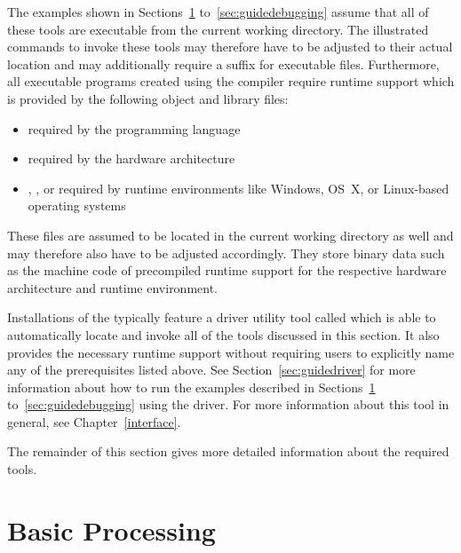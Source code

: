 The examples shown in Sections~\ref{sec:guidebasic} to~\ref{sec:guidedebugging} assume that all of these tools are executable from the current working directory.
The illustrated commands to invoke these tools may therefore have to be adjusted to their actual location and may additionally require a suffix for executable files.
Furthermore, all executable programs created using the compiler require runtime support which is provided by the following object and library files:

\begin{itemize}
\item {} required by the programming language
\item {} required by the hardware architecture
\item {}, , or  required by runtime environments like Windows, OS~X, or Linux-based operating systems
\end{itemize}

These files are assumed to be located in the current working directory as well and may therefore also have to be adjusted accordingly.
They store binary data such as the machine code of precompiled runtime support for the respective hardware architecture and runtime environment.
\seeobject

Installations of the \ecs{} typically feature a driver utility tool called  which is able to automatically locate and invoke all of the tools discussed in this section.
It also provides the necessary runtime support without requiring users to explicitly name any of the prerequisites listed above.
See Section~\ref{sec:guidedriver} for more information about how to run the examples described in Sections~\ref{sec:guidebasic} to~\ref{sec:guidedebugging} using the \ecs{} driver.
\ifbook For more information about this tool in general, see Chapter~\ref{interface}. \fi

The remainder of this section gives more detailed information about the required tools.
\interface

\renewcommand{\seeoberon}{}
\renewcommand{\seeassembly}{}
\renewcommand{\seeamd}{}
\renewcommand{\seedebugging}{}
\renewcommand{\seeobject}{}

\obprint
\obcheck
\obrun
\obamdc
\amdcasm
\amdcdism
\linklib
\linkbin
\mapsearch
\dbgdwarf

\section{Basic Processing}\label{sec:guidebasic}

